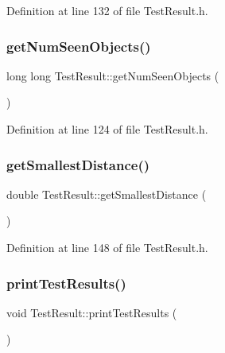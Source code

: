 Definition at line 132 of file Test\+Result.\+h.

\mbox{\label{class_test_result_a2fc8d3dc661c79d6432ea5724f0a27f1}} 
\subsubsection{\texorpdfstring{get\+Num\+Seen\+Objects()}{getNumSeenObjects()}}
{\footnotesize\ttfamily long long Test\+Result\+::get\+Num\+Seen\+Objects (\begin{DoxyParamCaption}{ }\end{DoxyParamCaption})\hspace{0.3cm}{\ttfamily [inline]}}



Definition at line 124 of file Test\+Result.\+h.

\mbox{\label{class_test_result_a592c4856a78c354fa97029c526eaa306}} 
\subsubsection{\texorpdfstring{get\+Smallest\+Distance()}{getSmallestDistance()}}
{\footnotesize\ttfamily double Test\+Result\+::get\+Smallest\+Distance (\begin{DoxyParamCaption}{ }\end{DoxyParamCaption})\hspace{0.3cm}{\ttfamily [inline]}}



Definition at line 148 of file Test\+Result.\+h.

\mbox{\label{class_test_result_a99aeb67d2dec816bcaf73d62554e65b9}} 
\subsubsection{\texorpdfstring{print\+Test\+Results()}{printTestResults()}}
{\footnotesize\ttfamily void Test\+Result\+::print\+Test\+Results (\begin{DoxyParamCaption}{ }\end{DoxyParamCaption})}

